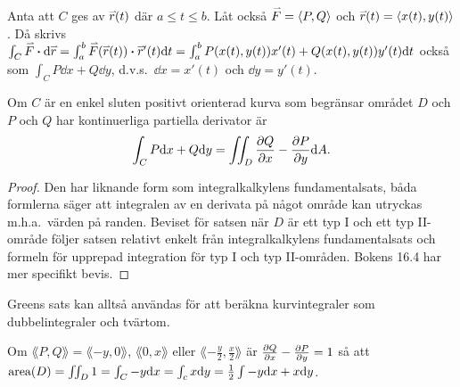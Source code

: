 \documentclass[a4paper]{article}
\begin{document}
\begin{defn}[Notation]
    Anta att \(
        C
    \) ges av \(
        \accentset{\rightharpoonup}{r}(t)
    \) där \(
        a \leq t \leq b
    \). Låt också \(
        \accentset{\rightharpoonup}{F} = \left\langle P, Q\right\rangle
    \) och \(
        \accentset{\rightharpoonup}{r}(t) = \left\langle x(t), y(t) \right\rangle
    \). Då skrivs \(
        \int_C \accentset{\rightharpoonup}{F} \boldsymbol{\cdot} \dd \accentset{\rightharpoonup}{r} = \int_a^b \accentset{\rightharpoonup}{F}(\accentset{\rightharpoonup}{r}(t)) \boldsymbol{\cdot} \accentset{\rightharpoonup}{r}'(t) \dd t
            = \int_a^b P(x(t), y(t)) x'(t) + Q(x(t), y(t))y'(t) \dd t
    \) också som \(
        \int_C P \dd x + Q \dd y
    \), d.v.s.\ \(
        \dd x = x'(t)
    \) och \(
        \dd y = y'(t)
    \).
\end{defn}

\begin{sats}
    Om \(
        C
    \) är en enkel sluten positivt orienterad kurva som begränsar området \(
        D
    \) och \(
        P
    \) och \(
        Q
    \) har kontinuerliga partiella derivator är \[
        \int_C P \dd x +  Q \dd y = \iint_D \pdv{Q}{x} - \pdv{P}{y} \dd A.
    \] 

    \begin{proof}
        Den har liknande form som integralkalkylens fundamentalsats, båda formlerna
        säger att integralen av en derivata på något område kan utryckas m.h.a.\ 
        värden på randen. Beviset för satsen när \(
            D
        \) är ett typ I och ett typ II-område följer satsen relativt enkelt från 
        integralkalkylens fundamentalsats och formeln för upprepad integration
        för typ I och typ II-områden. Bokens 16.4 har mer specifikt bevis. 
    \end{proof}
\end{sats}

Greens sats kan alltså användas för att beräkna kurvintegraler som dubbelintegraler 
och tvärtom. 

\begin{sats}
    Om \(
        \lang P, Q\rang = \lang -y, 0\rang
    \), \(
        \lang 0, x\rang
    \) eller \(
        \lang -\frac{y}{2} , \frac{x}{2}\rang 
    \) är \(
        \pdv{Q}{x} - \pdv{P}{y} = 1
    \) så att \(
        \text{area}(D) = \iint_D 1 = \int_C -y \dd x = \int_c x \dd y = \frac{1}{2} \int -y \dd x + x \dd y 
    \).
\end{sats}
\end{document}
